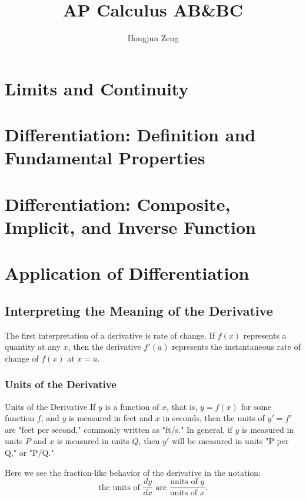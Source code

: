 \documentclass[12pt]{article}
\theoremstyle{beautifulthm}
\begin{document}
\title{AP Calculus AB\&BC}
\author{Hongjun Zeng}
\maketitle

\lipsum[1-10] 

\newpage
\tableofcontents

\newpage

\section{Limits and Continuity}
\section{Differentiation: Definition and Fundamental Properties}
\section{Differentiation: Composite, Implicit, and Inverse Function}
\section{Application of Differentiation}
\newpage
\subsection{Interpreting the Meaning of the Derivative}
The first interpretation of a derivative is rate of change. If \( f(x) \) represents a quantity at any \( x \), then the derivative \( f'(a) \) represents the instantaneous rate of change of \( f(x) \) at \( x = a \).

\subsubsection{Units of the Derivative}
\begin{mytheorem}{Units of the Derivative}{}
If \( y \) is a function of \( x \), that is,
\( y = f(x) \) for some function \( f \), and \( y \) is measured in feet and \( x \) in seconds, then the units of
\( y' = f' \) are "feet per second," commonly written as "ft/s." In general, if \( y \) is measured in units \( P \) and \( x \) is measured in units \( Q \), then \( y' \) will be measured in units "P per Q," or "P/Q."

Here we see the fraction-like behavior of the derivative in the notation:
\[
\text{the units of } \frac{dy}{dx} \text{ are } \frac{\text{units of } y}{\text{units of } x}.
\]
\end{mytheorem}
\end{document}
